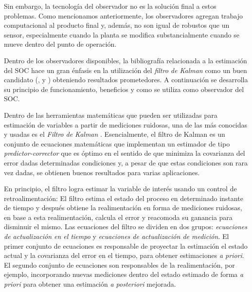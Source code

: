 \documentclass[10pt,a4paper]{article}
\newcounter{subsubsubsection}[subsubsection]
\begin{document}
\noindent Sin embargo, la tecnolog\'ia del observador no es la soluci\'on final
a estos problemas. Como mencionamos anteriormente, los observadores agregan
trabajo computacional al producto final y, adem\'as, no son igual de robustos
que un sensor, especialmente cuando la planta se modifica substancialmente
cuando se mueve dentro del punto de operaci\'on. 

\newpage

\noindent Dentro de los observadores disponibles, la bibliograf\'ia relacionada
a la estimaci\'on del \acrshort{SOC} hace un gran \'enfasis en la utilizaci\'on
del \emph{filtro de Kalman} como un buen candidato (\cite{spagnol_kalman}, 
\cite{zhihao_kalman} y \cite{atsushi_kalman}) obteniendo resultados
prometedores. A continuaci\'on se desarrolla su principio de funcionamiento, 
beneficios y como se utiliza como observador del \acrshort{SOC}.

\label{kalmanFilterMethod}

\noindent Dentro de las herramientas matem\'aticas que pueden ser utilizadas 
para estimaci\'on de variables a partir de mediciones ruidosas, una de las m\'as
conocidas y usadas es el \emph{Filtro de Kalman} \cite{kalman_filter_paper}. 
Esencialmente, el filtro de Kalman es un conjunto de ecuaciones matem\'aticas 
que implementan un estimador de tipo \emph{predictor-corrector} que es \'optimo 
en el sentido de que minimiza la covarianza del error dadas determinadas 
condiciones y, a pesar de que estas condiciones son rara vez dadas, se obtienen 
buenos resultados para varias aplicaciones.

\noindent En principio, el filtro logra estimar la variable de inter\'es usando 
un control de retroalimentaci\'on: El filtro estima el estado del proceso en 
determinado instante de tiempo y despu\'es obtiene la realimentaci\'on en forma 
de mediciones ruidosas, en base a esta realimentaci\'on, calcula el error y
reacomoda su ganancia para disminuir el mismo. Las ecuaciones del filtro se
dividen en dos grupos: \emph{ecuaciones de actualizaci\'on en el tiempo} 
y \emph{ecuaciones de actualizaci\'on de medici\'on}. El primer conjunto de
ecuaciones es responsable de proyectar la estimaci\'on el estado actual y la
covarianza del error en el tiempo, para obtener estimaciones \emph{a priori}. 
El segundo conjunto de ecuaciones son responsables de la realimentaci\'on, por 
ejemplo, incorporando nuevas mediciones dentro del estado estimado de forma 
\emph{a priori} para obtener una estimaci\'on \emph{a posteriori} mejorada.
\end{document}
